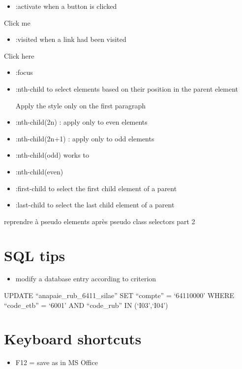 \documentclass[
]{book}
\providecommand{\tightlist}{%
  \setlength{\itemsep}{0pt}\setlength{\parskip}{0pt}}
\begin{document}
\begin{itemize}
\tightlist
\item
  :activate
  when a button is clicked
\end{itemize}

Click me

\begin{itemize}
\tightlist
\item
  :visited
  when a link had been visited
\end{itemize}

Click here

\begin{itemize}
\tightlist
\item
  :focus
\end{itemize}

\begin{itemize}
\item
  :nth-child
  to select elements based on their position in the parent element

  Apply the style only on the first paragraph
\item
  :nth-child(2n) : apply only to even elements
\item
  :nth-child(2n+1) : apply only to odd elements
\item
  :nth-child(odd) works to
\item
  :nth-child(even)
\item
  :first-child
  to select the first child element of a parent
\item
  :last-child
  to select the last child element of a parent
\end{itemize}

reprendre à pseudo elements après pseudo class selectors part 2

\hypertarget{sql-tips}{%
\chapter{SQL tips}\label{sql-tips}}

\begin{itemize}
\tightlist
\item
  modify a database entry according to criterion
\end{itemize}

UPDATE ``anapaie\_rub\_6411\_silae'' SET ``compte'' = `64110000'
WHERE ``code\_etb'' = `6001' AND ``code\_rub'' IN (`I03',`I04')

\hypertarget{keyboard-shortcuts}{%
\chapter{Keyboard shortcuts}\label{keyboard-shortcuts}}

\begin{itemize}
\tightlist
\item
  F12 = save as in MS Office
\end{itemize}

  
\end{document}
